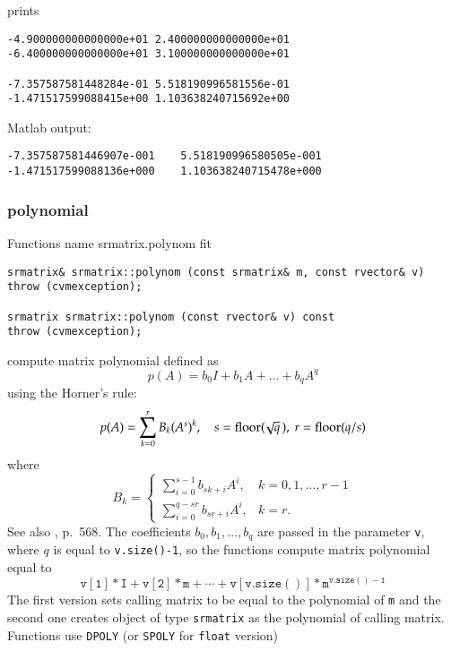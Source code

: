 prints
\begin{Verbatim}
-4.900000000000000e+01 2.400000000000000e+01
-6.400000000000000e+01 3.100000000000000e+01

-7.357587581448284e-01 5.518190996581556e-01
-1.471517599088415e+00 1.103638240715692e+00
\end{Verbatim}
Matlab output:
\begin{Verbatim}
-7.357587581446907e-001    5.518190996580505e-001
-1.471517599088136e+000    1.103638240715478e+000
\end{Verbatim}
\newpage





\subsubsection{polynomial}
Functions%
\pdfdest name {srmatrix.polynom} fit
\begin{verbatim}
srmatrix& srmatrix::polynom (const srmatrix& m, const rvector& v)
throw (cvmexception);

srmatrix srmatrix::polynom (const rvector& v) const
throw (cvmexception);
\end{verbatim}
compute  matrix polynomial defined as
\begin{equation*}
p(A)=b_0I+b_1A+\dots+b_qA^q
\end{equation*}
using the Horner's rule:
\begin{equation*}
p(A)=\sum_{k=0}^r B_k(A^s)^k,\quad s=\operatorname{floor}(\!\sqrt{q}\,),\ r=\operatorname{floor}(q/s)
\end{equation*}
where
\begin{equation*}
B_k=\begin{cases}
\sum\limits_{i=0}^{s-1}b_{sk+i} A^i, & k=0,1,\dots,r-1\\
\sum\limits_{i=0}^{q-sr}b_{sr+i} A^i, & k=r.
\end{cases}
\end{equation*}
See also , p.~568.
The coefficients $b_0,b_1,\dots,b_q$ are passed in the parameter 
\verb"v",
where $q$ is equal to \verb"v.size()-1", so the functions
compute matrix polynomial equal to
\begin{equation*}
\mathtt{v[1]*I + v[2]*m +\cdots + v[v.size()]*m^{v.size()-1}}
\end{equation*}
The first version sets  calling matrix to be equal to the polynomial of
\verb"m"
and the second one
creates  object of type \verb"srmatrix" as the 
polynomial of  calling matrix.
Functions use \verb"DPOLY" (or \verb"SPOLY" for \verb"float" version)

